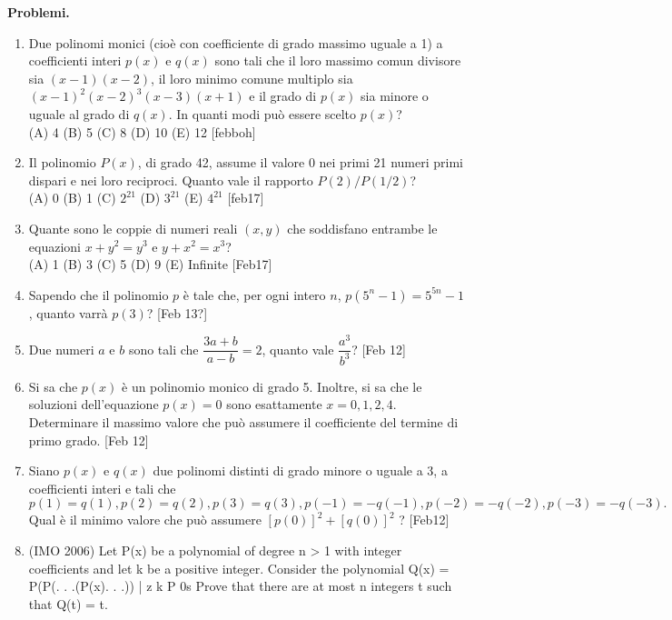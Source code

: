 \documentclass[a4paper]{article}
\theoremstyle{remark}
\theoremstyle{definition}
\begin{document}
\textbf{Problemi.}

\begin{enumerate}
	\item Due polinomi monici (cioè con coefficiente di grado massimo uguale a 1) a coefficienti interi $ p(x) $ e $ q(x) $ sono tali che il loro massimo comun divisore sia $ (x - 1)(x - 2) $, il loro minimo comune multiplo sia $ (x-1)^2 (x-2)^3(x-3)(x+ 1)$ e il grado di $ p(x) $ sia minore o uguale al grado di $ q(x) $. In quanti modi può essere scelto $ p(x) $?\\
	(A) 4 (B) 5 (C) 8 (D) 10 (E) 12 [febboh]
	
	\item Il polinomio $ P(x) $, di grado 42, assume il valore 0 nei primi 21 numeri primi dispari e nei loro reciproci. Quanto vale il rapporto $ P(2)/P(1/2) $?\\
	(A) 0 (B) 1 (C) $ 2^{21} $ (D) $ 3^{21} $ (E) $ 4^{21} $ [feb17]
	
	\item Quante sono le coppie di numeri reali $ (x,y) $ che soddisfano entrambe le equazioni $ x + y^2 = y^3 $ e $ y + x^2 = x^3 $?\\
	(A) 1 (B) 3 (C) 5 (D) 9 (E) Infinite [Feb17]
	
	\item Sapendo che il polinomio $ p $ è tale che, per ogni intero $ n $, $ p(5^n - 1) = 5^{5n} - 1 $, quanto varrà $ p(3) $? [Feb 13?]
	
	\item Due numeri $ a $ e $ b $ sono tali che $ \dfrac{3a+b}{a-b} = 2 $, quanto vale $ \dfrac{a^3}{b^3} $? [Feb 12]
	
	\item Si sa che $ p(x) $ è un polinomio monico di grado 5. Inoltre, si sa che le soluzioni dell’equazione $ p(x) = 0 $ sono esattamente $ x = 0, 1, 2, 4 $. Determinare il massimo valore che può assumere il coefficiente del termine di primo grado. [Feb 12]
	
	\item Siano $ p(x) $ e $ q(x) $ due polinomi distinti di grado minore o uguale a 3, a coefficienti interi e tali che$$  
	p(1) = q(1), p(2) = q(2), p(3) = q(3),
	p(-1) = -q(-1), p(-2) = -q(-2), p(-3) = -q(-3).
	 $$	Qual è il minimo valore che può assumere $ [p(0)]^2 + [q(0)]^2 $ ? [Feb12]
	 
	 \item  (IMO 2006) Let P(x) be a polynomial of degree n > 1 with integer coefficients and let k be a
	 positive integer. Consider the polynomial
	 Q(x) = P(P(. . .(P(x). . .))
	 | {z }
	 k P 0s
	 Prove that there are at most n integers t such that Q(t) = t.
\end{enumerate}
\end{document}
